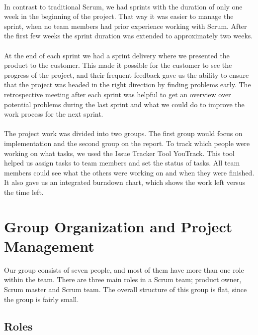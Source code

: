 \paragraph{} In contrast to traditional Scrum, we had sprints with the duration of only one week in the beginning of the project. That way it was easier to manage the sprint, when no team members had prior experience working with Scrum. After the first few weeks the sprint duration was extended to approximately two weeks.

\paragraph{} At the end of each sprint we had a sprint delivery where we presented the product to the customer. This made it possible for the customer to see the progress of the project, and their frequent feedback gave us the ability to ensure that the project was headed in the right direction by finding problems early. The retrospective meeting after each sprint was helpful to get an overview over potential problems during the last sprint and what we could do to improve the work process for the next sprint. 

\paragraph{} The project work was divided into two groups. The first group would focus on implementation and the second group on the report. To track which people were working on what tasks, we used the Issue Tracker Tool YouTrack. This tool helped us assign tasks to team members and set the status of tasks. All team members could see what the others were working on and when they were finished. It also gave us an integrated burndown chart, which shows the work left versus the time left.


\section{Group Organization and Project Management}
\label{sec:PlanningGroupOrg}
Our group consists of seven people, and most of them have more than one role within the team. There are three main roles in a Scrum team; product owner, Scrum master and Scrum team. The overall structure of this group is flat, since the group is fairly small.

\subsection{Roles}
\label{subsec:PlanningGroupOrgRoles}
